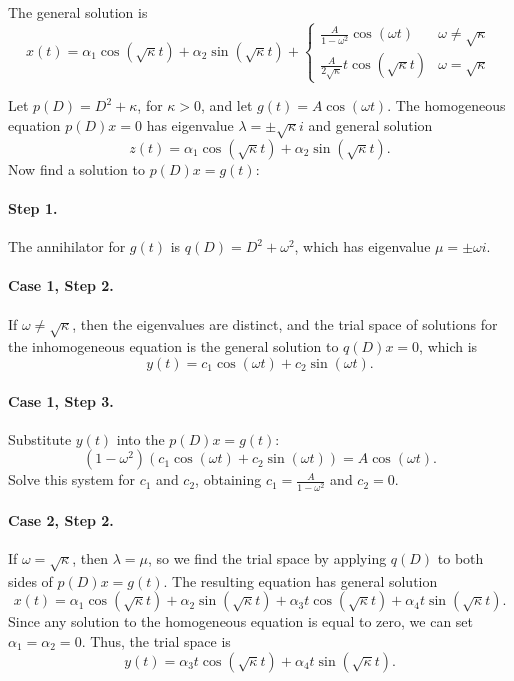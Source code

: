 \documentclass{ximera}
\begin{document}
 \ans The general solution is
\[
x(t) = \alpha_1\cos(\sqrt{\kappa}t) + \alpha_2\sin(\sqrt{\kappa}t)
+ \left\{
\begin{array}{lr} \frac{A}{1 - \omega^2}\cos(\omega t) &
\omega \neq \sqrt{\kappa} \\
\frac{A}{2\sqrt{\kappa}}t\cos(\sqrt{\kappa}t) &
\omega = \sqrt{\kappa}
\end{array}\right.
\]

\soln Let $p(D) = D^2 + \kappa$, for $\kappa > 0$, and let $g(t) =
A\cos(\omega t)$.  The homogeneous equation $p(D)x = 0$ has eigenvalue
$\lambda = \pm \sqrt{\kappa} i$ and general solution
\[
z(t) = \alpha_1\cos(\sqrt{\kappa}t) + \alpha_2\sin(\sqrt{\kappa}t).
\]
Now find a solution to $p(D)x = g(t)$:

\paragraph{Step 1.} The annihilator for $g(t)$ is $q(D) =
D^2 + \omega^2$, which has eigenvalue $\mu = \pm \omega i$.

\paragraph{Case 1, Step 2.} If $\omega \neq \sqrt{\kappa}$, then the
eigenvalues are distinct, and the trial space of solutions for the
inhomogeneous equation is the general solution to $q(D)x = 0$, which
is
\[
y(t) = c_1\cos(\omega t) + c_2\sin(\omega t).
\]
\paragraph{Case 1, Step 3.} Substitute $y(t)$ into the $p(D)x = g(t)$:
\[
(1 - \omega^2)(c_1\cos(\omega t) + c_2\sin(\omega t)) = A\cos(\omega t).
\]
Solve this system for $c_1$ and $c_2$, obtaining $c_1 = \frac{A}
{1 - \omega^2}$ and $c_2 = 0$.

\paragraph{Case 2, Step 2.} If $\omega = \sqrt{\kappa}$, then $\lambda =
\mu$, so we find the trial space by applying $q(D)$ to both sides of
$p(D)x = g(t)$.  The resulting equation has general solution
\[
x(t) = \alpha_1\cos(\sqrt{\kappa}t) + \alpha_2\sin(\sqrt{\kappa}t)
+ \alpha_3t\cos(\sqrt{\kappa}t) + \alpha_4t\sin(\sqrt{\kappa}t).
\]
Since any solution to the homogeneous equation is equal to zero, we can
set $\alpha_1 = \alpha_2 = 0$.  Thus, the trial space is
\[
y(t) = \alpha_3t\cos(\sqrt{\kappa}t) + \alpha_4t\sin(\sqrt{\kappa}t).
\]
\end{document}
